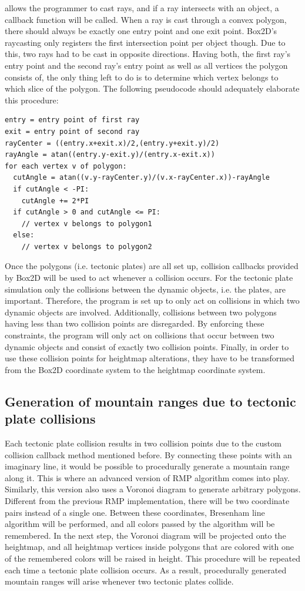 \documentclass[11pt,a4paper,twoside,openright]{report}
\begin{document}
allows the programmer to cast rays, and if a ray intersects with an object, a callback function will be called. When a ray is cast through a convex polygon, there should always be exactly one entry point and one exit point. Box2D's raycasting only registers the first intersection point per object though. Due to this, two rays had to be cast in opposite directions. Having both, the first ray's entry point and the second ray's entry point as well as all vertices the polygon consists of, the only thing left to do is to determine which vertex belongs to which slice of the polygon. The following pseudocode should adequately elaborate this procedure:
\begin{lstlisting}[caption=Point in slice check pseudocode]
entry = entry point of first ray
exit = entry point of second ray
rayCenter = ((entry.x+exit.x)/2,(entry.y+exit.y)/2)
rayAngle = atan((entry.y-exit.y)/(entry.x-exit.x))
for each vertex v of polygon:
  cutAngle = atan((v.y-rayCenter.y)/(v.x-rayCenter.x))-rayAngle
  if cutAngle < -PI:
    cutAngle += 2*PI
  if cutAngle > 0 and cutAngle <= PI:
    // vertex v belongs to polygon1
  else:
    // vertex v belongs to polygon2
\end{lstlisting}
Once the polygons (i.e. tectonic plates) are all set up, collision callbacks provided by Box2D will be used to act whenever a collision occurs. For the tectonic plate simulation only the collisions between the dynamic objects, i.e. the plates, are important. Therefore, the program is set up to only act on collisions in which two dynamic objects are involved. Additionally, collisions between two polygons having less than two collision points are disregarded. By enforcing these constraints, the program will only act on collisions that occur between two dynamic objects and consist of exactly two collision points. Finally, in order to use these collision points for heightmap alterations, they have to be transformed from the Box2D coordinate system to the heightmap coordinate system.

\subsection{Generation of mountain ranges due to tectonic plate collisions}
\label{subsec:generationofmountainranges}
Each tectonic plate collision results in two collision points due to the custom collision callback method mentioned before. By connecting these points with an imaginary line, it would be possible to procedurally generate a mountain range along it. This is where an advanced version of RMP algorithm comes into play. Similarly, this version also uses a Voronoi diagram to generate arbitrary polygons. Different from the previous RMP implementation, there will be two coordinate pairs instead of a single one. Between these coordinates, Bresenham line algorithm will be performed, and all colors passed by the algorithm will be remembered. In the next step, the Voronoi diagram will be projected onto the heightmap, and all heightmap vertices inside polygons that are colored with one of the remembered colors will be raised in height. This procedure will be repeated each time a tectonic plate collision occurs. As a result, procedurally generated mountain ranges will arise whenever two tectonic plates collide.
\end{document}

